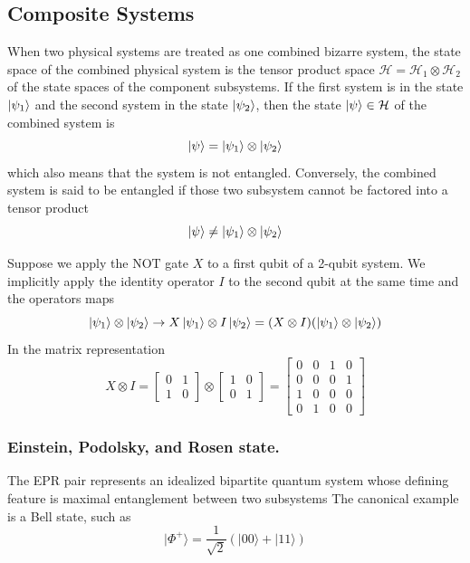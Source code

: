 \documentclass[../../../main.tex]{subfiles}
\begin{document}
\subsection{Composite Systems}
When two physical systems are treated as one combined bizarre system, the state space of the combined physical system is the tensor product space $\mathcal{H}=\mathcal{H}_1 \otimes \mathcal{H}_2$ of the state spaces of the component subsystems.
If the first system is in the state $\ket{\psi_1}$ and the second system in the state $\ket{\psi_2}$, then the state $\ket{\psi}\in \mathcal{H}$ of the combined system is
\begin{equation*}
  \ket{\psi}=\ket{\psi_1} \otimes \ket{\psi_2}
\end{equation*}
which also means that the system is not entangled.
Conversely, the combined system is said to be entangled if those two subsystem cannot be factored into a tensor product
\begin{equation*}
  \ket{\psi}\neq\ket{\psi_1} \otimes \ket{\psi_2}
\end{equation*}

Suppose we apply the $\mathrm{NOT}$ gate $X$ to a ﬁrst qubit of a 2-qubit system.
We implicitly apply the identity operator $I$ to the second qubit at the same time and the operators maps
\begin{equation*}
  \ket{\psi_1} \otimes \ket{\psi_2} \to X \ket{\psi_1} \otimes I \ket{\psi_2} = (X \otimes I)(\ket{\psi_1} \otimes \ket{\psi_2})
\end{equation*}
In the matrix representation
\begin{equation*}
  X \otimes I =
  \begin{bmatrix}
    0 & 1 \\
    1 & 0
  \end{bmatrix} \otimes \begin{bmatrix}
    1 & 0 \\
    0 & 1
  \end{bmatrix} = \begin{bmatrix}
    0 & 0 & 1 & 0 \\
    0 & 0 & 0 & 1 \\
    1 & 0 & 0 & 0 \\
    0 & 1 & 0 & 0
  \end{bmatrix}
\end{equation*}

\subsubsection{Einstein, Podolsky, and Rosen state.}
The EPR pair represents an idealized bipartite quantum system whose defining feature is maximal entanglement between two subsystems
The canonical example is a Bell state, such as
\begin{equation*}
  |\Phi^+\rangle = \frac{1}{\sqrt{2}} \left( |00\rangle + |11\rangle \right)
\end{equation*}
\end{document}

